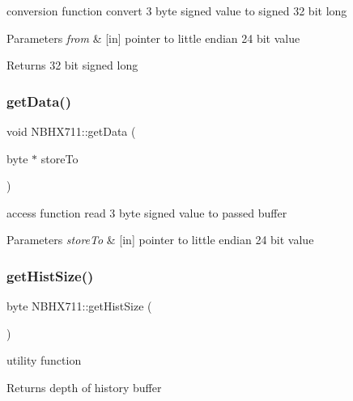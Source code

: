 conversion function convert 3 byte signed value to signed 32 bit long 
\begin{DoxyParams}{Parameters}
{\em from} & \mbox{[}in\mbox{]} pointer to little endian 24 bit value \\
\hline
\end{DoxyParams}
\begin{DoxyReturn}{Returns}
32 bit signed long 
\end{DoxyReturn}
\mbox{\label{class_n_b_h_x711_a54531c0c1d287f530ef450783dcf7738}} 
\subsubsection{\texorpdfstring{get\+Data()}{getData()}}
{\footnotesize\ttfamily void N\+B\+H\+X711\+::get\+Data (\begin{DoxyParamCaption}\item[{byte $\ast$}]{store\+To }\end{DoxyParamCaption})\hspace{0.3cm}{\ttfamily [protected]}}

access function read 3 byte signed value to passed buffer 
\begin{DoxyParams}{Parameters}
{\em store\+To} & \mbox{[}in\mbox{]} pointer to little endian 24 bit value \\
\hline
\end{DoxyParams}
\mbox{\label{class_n_b_h_x711_ae12eee691226d1ba83a97bf7562f9847}} 
\subsubsection{\texorpdfstring{get\+Hist\+Size()}{getHistSize()}}
{\footnotesize\ttfamily byte N\+B\+H\+X711\+::get\+Hist\+Size (\begin{DoxyParamCaption}{ }\end{DoxyParamCaption})}

utility function \begin{DoxyReturn}{Returns}
depth of history buffer 
\end{DoxyReturn}
\mbox{\label{class_n_b_h_x711_a415f456a258312956e4b044bc4623190}} 
